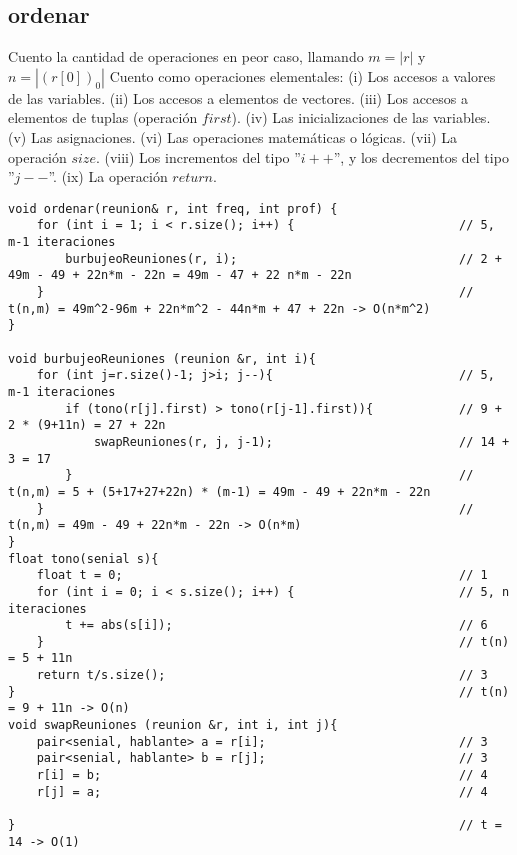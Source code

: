 \documentclass{article}
\begin{document}
\subsection{ordenar}
Cuento la cantidad de operaciones en peor caso, llamando $m=|r|$ y $n=|(r[0])_0|$
Cuento como operaciones elementales: \newline
(i) Los accesos a valores de las variables. \newline
(ii) Los accesos a elementos de vectores. \newline
(iii) Los accesos a elementos de tuplas (operación $first$). \newline
(iv) Las inicializaciones de las variables. \newline
(v) Las asignaciones. \newline
(vi) Las operaciones matemáticas o lógicas. \newline
(vii) La operación $size$. \newline
(viii) Los incrementos del tipo ”$i++$”, y los decrementos del tipo ”$j--$”. \newline
(ix) La operación $return$. \newline

\begin{lstlisting}
void ordenar(reunion& r, int freq, int prof) {
    for (int i = 1; i < r.size(); i++) {                       // 5, m-1 iteraciones
        burbujeoReuniones(r, i);                               // 2 + 49m - 49 + 22n*m - 22n = 49m - 47 + 22 n*m - 22n
    }                                                          // t(n,m) = 49m^2-96m + 22n*m^2 - 44n*m + 47 + 22n -> O(n*m^2)
}

void burbujeoReuniones (reunion &r, int i){
    for (int j=r.size()-1; j>i; j--){                          // 5, m-1 iteraciones
        if (tono(r[j].first) > tono(r[j-1].first)){            // 9 + 2 * (9+11n) = 27 + 22n
            swapReuniones(r, j, j-1);                          // 14 + 3 = 17
        }                                                      // t(n,m) = 5 + (5+17+27+22n) * (m-1) = 49m - 49 + 22n*m - 22n
    }                                                          // t(n,m) = 49m - 49 + 22n*m - 22n -> O(n*m)
}
float tono(senial s){
    float t = 0;                                               // 1
    for (int i = 0; i < s.size(); i++) {                       // 5, n iteraciones
        t += abs(s[i]);                                        // 6
    }                                                          // t(n) = 5 + 11n
    return t/s.size();                                         // 3
}                                                              // t(n) = 9 + 11n -> O(n)
void swapReuniones (reunion &r, int i, int j){
    pair<senial, hablante> a = r[i];                           // 3
    pair<senial, hablante> b = r[j];                           // 3
    r[i] = b;                                                  // 4
    r[j] = a;                                                  // 4

}                                                              // t = 14 -> O(1)
\end{lstlisting}
\end{document}
